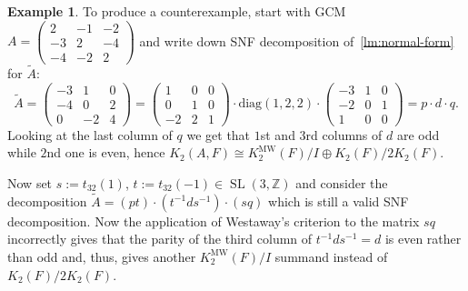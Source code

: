 \documentclass[oneside, 10pt]{amsart}
\theoremstyle{plain}
\theoremstyle{remark}
\theoremstyle{definition}
\newtheorem{example}{Example} \Crefname{example}{Example}{Examples}
\DeclareMathOperator{\SL}{SL}
\newcommand{\ZZ}{\mathbb{Z}}
\newcommand{\K}{K_2}
\newcommand{\Kmw}{K^{\mathrm{MW}}_2}
\begin{document}
\begin{example}
To produce a counterexample, start with GCM 
 $A = \left(\begin{smallmatrix}
 2& -1& -2\\
-3& 2& -4\\
-4& -2& 2\end{smallmatrix}\right)$
  and write down SNF decomposition of~\cref{lm:normal-form} for $\widetilde{A}$:
\[\widetilde{A} = \left(\begin{smallmatrix}
-3& 1& 0 \\
-4& 0& 2 \\
 0& -2& 4
\end{smallmatrix} \right) = \left(\begin{smallmatrix}
 1& 0& 0\\
 0& 1& 0\\
-2& 2& 1\end{smallmatrix}\right) \cdot \mathrm{diag}(1,2,2) \cdot \left(\begin{smallmatrix}
-3& 1& 0\\
-2& 0& 1\\
 1& 0& 0 \end{smallmatrix}\right) = p \cdot d \cdot q.\]
Looking at the last column of $q$ we get that $1$st and $3$rd columns of $d$ are odd while $2$nd one is even,
 hence $\K(A, F) \cong \Kmw(F)/I \oplus \K(F)/2\K(F)$.

Now set $s:= t_{32}(1)$, $t:= t_{32}(-1) \in \SL(3, \ZZ)$ and consider the decomposition 
$\widetilde{A} = (p t) \cdot (t^{-1} d s^{-1}) \cdot (s q)$ which is still a valid SNF decomposition.
Now the application of Westaway's criterion to the matrix $sq$ incorrectly gives that the parity of the third column of $t^{-1}ds^{-1}=d$ is even rather than odd
 and, thus, gives another $\Kmw(F)/I$ summand instead of $\K(F)/2\K(F)$.
\end{example}

\printbibliography
\end{document}
